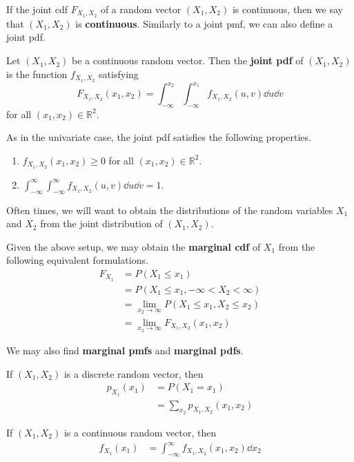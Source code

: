 If the joint cdf $F_{X_1,X_2}$ of a random vector $(X_1,X_2)$ is continuous, then we say that $(X_1,X_2)$ is \textbf{continuous}. Similarly to a joint pmf, we can also define a joint pdf.

\begin{definition}
	Let $(X_1,X_2)$ be a continuous random vector. Then the \textbf{joint pdf} of $(X_1,X_2)$ is the function $f_{X_1,X_2}$ satisfying
	$$F_{X_1,X_2}(x_1,x_2)=\int_{-\infty}^{x_2}\int_{-\infty}^{x_1}f_{X_1,X_2}(u,v)\dd u\dd v$$
	for all $(x_1,x_2)\in\mathbb R^2$.
\end{definition}

As in the univariate case, the joint pdf satisfies the following properties.
\begin{enumerate}
	\item $f_{X_1,X_2}(x_1,x_2)\geq 0$ for all $(x_1,x_2)\in\mathbb R^2$.
	\item $\int_{-\infty}^{\infty}\int_{-\infty}^{\infty}f_{X_1,X_2}(u,v)\dd u\dd v=1$.
\end{enumerate}

Often times, we will want to obtain the distributions of the random variables $X_1$ and $X_2$ from the joint distribution of $(X_1,X_2)$.

Given the above setup, we may obtain the \textbf{marginal cdf} of $X_1$ from the following equivalent formulations.
\begin{align*}
	F_{X_1}&=P(X_1\leq x_1)\\
	&=P(X_1\leq x_1,-\infty<X_2<\infty)\\
	&=\lim_{x_2\to\infty}P(X_1\leq x_1,X_2\leq x_2)\\
	&=\lim_{x_2\to\infty} F_{X_1,X_2}(x_1,x_2)
\end{align*}

We may also find \textbf{marginal pmfs} and \textbf{marginal pdfs}.

If $(X_1,X_2)$ is a discrete random vector, then
\begin{align*}
	p_{X_1}(x_1)&=P(X_1=x_1)\\
	&=\sum_{x_2}p_{X_1,X_2}(x_1,x_2)
\end{align*}

If $(X_1,X_2)$ is a continuous random vector, then
\begin{align*}
	f_{X_1}(x_1)&=\int_{-\infty}^{\infty}f_{X_1,X_2}(x_1,x_2)\dd{x_2}\\
\end{align*}

